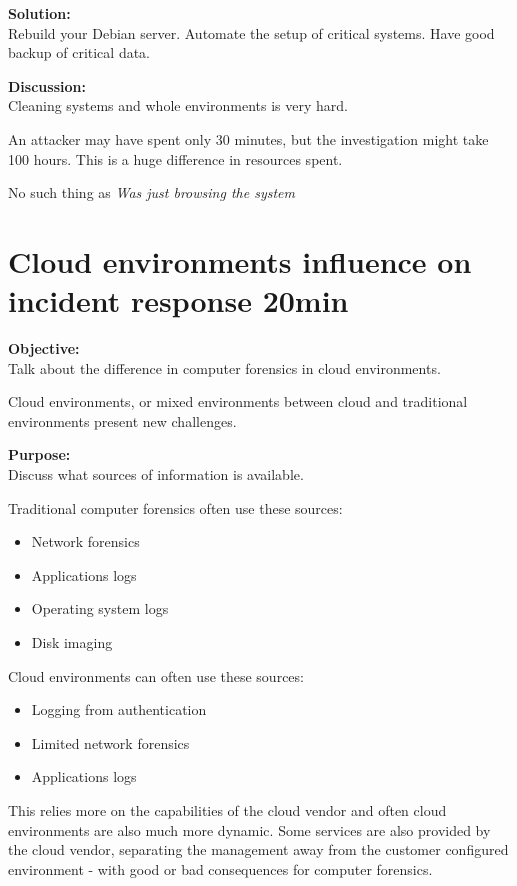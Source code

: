 \documentclass[a4paper,11pt,notitlepage]{report}
\begin{document}
{\bf Solution:}\\
Rebuild your Debian server.
Automate the setup of critical systems.
Have good backup of critical data.

{\bf Discussion:}\\
Cleaning systems and whole environments is very hard.

An attacker may have spent only 30 minutes, but the investigation might take 100 hours. This is a huge difference in resources spent.

No such thing as \emph{Was just browsing the system}

\chapter{Cloud environments influence on incident response 20min}
\label{ex:cloud-incident-response}

{\bf Objective:}\\
Talk about the difference in computer forensics in cloud environments.

Cloud environments, or mixed environments between cloud and traditional environments present new challenges.

{\bf Purpose:}\\
Discuss what sources of information is available.

Traditional computer forensics often use these sources:
\begin{itemize}
\item Network forensics
\item Applications logs
\item Operating system logs
\item Disk imaging
\end{itemize}

Cloud environments can often use these sources:

\begin{itemize}
\item Logging from authentication
\item Limited network forensics
\item Applications logs
\end{itemize}

This relies more on the capabilities of the cloud vendor and often cloud environments are also much more dynamic. Some services are also provided by the cloud vendor, separating the management away from the customer configured environment - with good or bad consequences for computer forensics.
\end{document}
